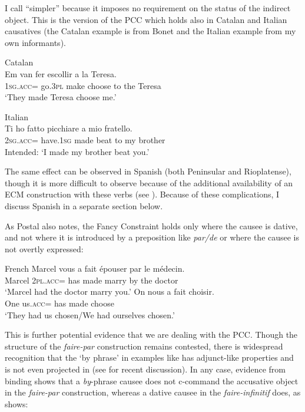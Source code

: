 \documentclass[output=paper,colorlinks,citecolor=brown,nonflat]{langsci/langscibook}
\begin{document}
I call  ``simpler'' because it imposes no requirement on the status of the indirect object. This is the version of the PCC which holds also in Catalan and Italian causatives (the Catalan example is from Bonet and the Italian example from my own informants).

\ea%
    \label{ex:sheehan:17}
    Catalan \citep[195]{Bonet1991}\\
    \gll   *Em       van     fer     escollir   a   la   Teresa.\\
            \textsc{1sg}.\textsc{acc}=  go.\textsc{3pl}   make   choose   to   the   Teresa\\
    \glt ‘They made Teresa choose me.’
\z

\ea%
    \label{ex:sheehan:18}
    Italian\\
    \gll   *Ti     ho     fatto   picchiare     a   mio   fratello.\\
         \textsc{2sg}.\textsc{acc}=  have.\textsc{1sg}   made beat         to   my   brother\\
    \glt    Intended: ‘I made my brother beat you.’
\z

The same effect can be observed in Spanish (both Peninsular and Rioplatense), though it is more difficult to observe because of the additional availability of an ECM construction with these verbs (see \citealt{Strozer1976, Torrego2010}). Because of these complications, I discuss Spanish in a separate section below.

As Postal also notes, the Fancy Constraint holds only where the causee is dative, and not where it is introduced by a preposition like \textit{par/de} or where the causee is not overtly expressed:

\ea%
    \label{ex:sheehan:19}
    French \citep[3]{Postal1989}
    \ea\label{ex:sheehan:19a}
    \gll    Marcel vous     a  fait   épouser   par   le   médecin.\\
            Marcel \textsc{2pl}.\textsc{acc}=  has  made   marry   by   the   doctor\\
    \glt ‘Marcel had the doctor marry you.’
    \ex\label{ex:sheehan:19b}
    \gll   On  nous     a   fait choisir.\\
            One   us.\textsc{acc}=  has   made choose\\
    \glt    ‘They had us chosen/We had ourselves chosen.’
    \z
\z

This is further potential evidence that we are dealing with the PCC. Though the structure of the \textit{faire-par} construction remains contested, there is widespread recognition that the ‘by phrase’ in examples like  has adjunct-like properties and is not even projected in  (see \citealt{Guasti1996, FolliHarley2007, SheehanCyrino2016} for recent discussion). In any case, evidence from binding shows that a \textit{by}-phrase causee does not c-command the accusative object in the \textit{faire-par} construction, whereas a dative causee in the \textit{faire-infinitif} does, as \citet{Burzio1986} shows:
\end{document}
